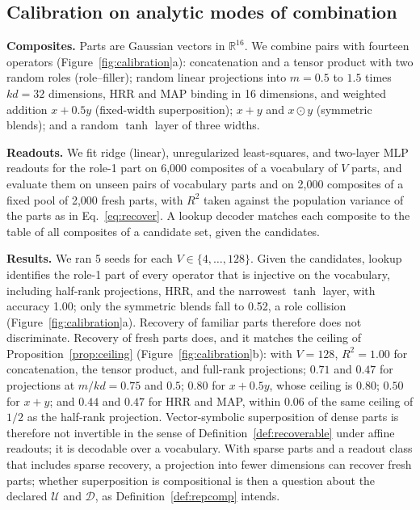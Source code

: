 \documentclass[10pt]{article}
\theoremstyle{plain}
\theoremstyle{remark}
\newcommand{\R}{\mathbb{R}}
\newcommand{\U}{\mathcal{U}}
\newcommand{\D}{\mathcal{D}}
\begin{document}
\subsection{Calibration on analytic modes of combination}
\label{sec:calibration}

\textbf{Composites.} Parts are Gaussian vectors in $\R^{16}$. We combine pairs with fourteen operators (Figure~\ref{fig:calibration}a): concatenation and a tensor product with two random roles (role--filler); random linear projections into $m = 0.5$ to $1.5$ times $kd = 32$ dimensions, HRR and MAP binding in 16 dimensions, and weighted addition $x + 0.5y$ (fixed-width superposition); $x + y$ and $x \odot y$ (symmetric blends); and a random $\tanh$ layer of three widths.

\textbf{Readouts.} We fit ridge (linear), unregularized least-squares, and two-layer MLP readouts for the role-1 part on 6{,}000 composites of a vocabulary of $V$ parts, and evaluate them on unseen pairs of vocabulary parts and on 2{,}000 composites of a fixed pool of 2{,}000 fresh parts, with $R^2$ taken against the population variance of the parts as in Eq.~\eqref{eq:recover}. A lookup decoder matches each composite to the table of all composites of a candidate set, given the candidates.

\textbf{Results.} We ran 5 seeds for each $V \in \{4, \ldots, 128\}$. Given the candidates, lookup identifies the role-1 part of every operator that is injective on the vocabulary, including half-rank projections, HRR, and the narrowest $\tanh$ layer, with accuracy 1.00; only the symmetric blends fall to 0.52, a role collision (Figure~\ref{fig:calibration}a). Recovery of familiar parts therefore does not discriminate. Recovery of fresh parts does, and it matches the ceiling of Proposition~\ref{prop:ceiling} (Figure~\ref{fig:calibration}b): with $V = 128$, $R^2 = 1.00$ for concatenation, the tensor product, and full-rank projections; $0.71$ and $0.47$ for projections at $m/kd = 0.75$ and $0.5$; $0.80$ for $x + 0.5y$, whose ceiling is $0.80$; $0.50$ for $x + y$; and $0.44$ and $0.47$ for HRR and MAP, within 0.06 of the same ceiling of $1/2$ as the half-rank projection. Vector-symbolic superposition of dense parts is therefore not invertible in the sense of Definition~\ref{def:recoverable} under affine readouts; it is decodable over a vocabulary. With sparse parts and a readout class that includes sparse recovery, a projection into fewer dimensions can recover fresh parts; whether superposition is compositional is then a question about the declared $\U$ and $\D$, as Definition~\ref{def:repcomp} intends.
\end{document}
